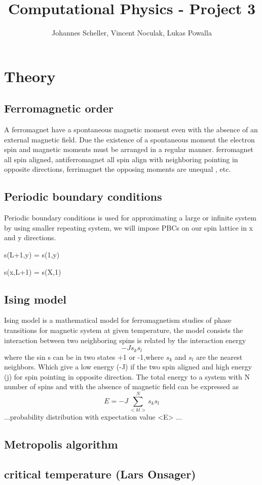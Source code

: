 \documentclass[10pt,a4paper]{article}
\author{Johannes Scheller, Vincent Noculak, Lukas Powalla}
\title{Computational Physics - Project 3}
\begin{document}
\section{Theory}
\subsection{Ferromagnetic order}

A ferromagnet have a spontaneous magnetic moment even with the absence of an external magnetic field. Due the existence of a spontaneous moment the electron spin and magnetic moments must be arranged in a regular manner.
ferromagnet all spin aligned, antiferromagnet all spin align with neighboring pointing in opposite directions, ferrimagnet the opposing moments are unequal , etc.
   

\subsection{Periodic boundary conditions} 
Periodic boundary conditions is used for approximating a large or infinite system by using smaller repeating system, we will impose PBCs on our spin lattice in x and y directions.

 s(L+1,y) = s(1,y)
 
 s(x,L+1) = s(X,1)  

\subsection{Ising model}
Ising model is a mathematical model for ferromagnetism studies of phase transitions for magnetic system at given temperature, the model consists the interaction between two neighboring spins is related by the interaction energy 
\begin{equation}
  -Js_ks_l
\end{equation} 
where the sin s can be in two states +1 or -1,where  $s_k$ and $s_l$ are the nearest neighbors. Which give a low energy (-J) if the two spin aligned and high energy (j) for spin pointing in opposite direction. The total energy to a system with N number of spins and with the absence of magnetic field can be expressed as 
\begin{equation}
  E=-J\sum_{<kl>}^{N}s_ks_l
\end{equation}
...probability distribution with expectation value <E> ...
  
\subsection{Metropolis algorithm}

\subsection{critical temperature (Lars Onsager)}
\end{document}
